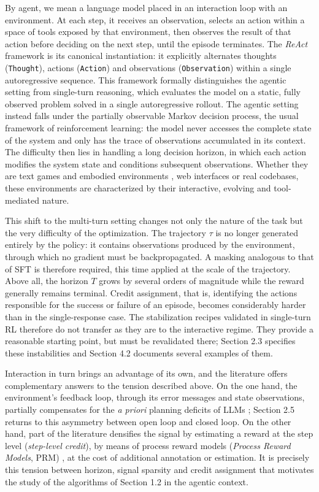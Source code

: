 \documentclass[11pt,a4paper]{article}
\begin{document}
By agent, we mean a language model placed in an interaction loop with an environment. At each step, it receives an observation, selects an action within a space of tools exposed by that environment, then observes the result of that action before deciding on the next step, until the episode terminates. The \emph{ReAct} framework \cite{yao2023react} is its canonical instantiation: it explicitly alternates thoughts (\texttt{Thought}), actions (\texttt{Action}) and observations (\texttt{Observation}) within a single autoregressive sequence. This framework formally distinguishes the agentic setting from single-turn reasoning, which evaluates the model on a static, fully observed problem solved in a single autoregressive rollout. The agentic setting instead falls under the partially observable Markov decision process, the usual framework of reinforcement learning: the model never accesses the complete state of the system and only has the trace of observations accumulated in its context. The difficulty then lies in handling a long decision horizon, in which each action modifies the system state and conditions subsequent observations. Whether they are text games and embodied environments \cite{shridhar2020alfworld}, web interfaces \cite{zhou2023webarena} or real codebases, these environments are characterized by their interactive, evolving and tool-mediated nature.

This shift to the multi-turn setting changes not only the nature of the task but the very difficulty of the optimization. The trajectory $\tau$ is no longer generated entirely by the policy: it contains observations produced by the environment, through which no gradient must be backpropagated. A masking analogous to that of SFT is therefore required, this time applied at the scale of the trajectory. Above all, the horizon $T$ grows by several orders of magnitude while the reward generally remains terminal. Credit assignment, that is, identifying the actions responsible for the success or failure of an episode, becomes considerably harder than in the single-response case. The stabilization recipes validated in single-turn RL therefore do not transfer as they are to the interactive regime. They provide a reasonable starting point, but must be revalidated there; Section 2.3 specifies these instabilities and Section 4.2 documents several examples of them.

Interaction in turn brings an advantage of its own, and the literature offers complementary answers to the tension described above. On the one hand, the environment's feedback loop, through its error messages and state observations, partially compensates for the \emph{a priori} planning deficits of LLMs \cite{yao2023react, kambhampati2024llmmodulo}; Section 2.5 returns to this asymmetry between open loop and closed loop. On the other hand, part of the literature densifies the signal by estimating a reward at the step level (\emph{step-level credit}), by means of process reward models (\emph{Process Reward Models}, PRM) \cite{lightman2023verify}, at the cost of additional annotation or estimation. It is precisely this tension between horizon, signal sparsity and credit assignment that motivates the study of the algorithms of Section 1.2 in the agentic context.
\end{document}
